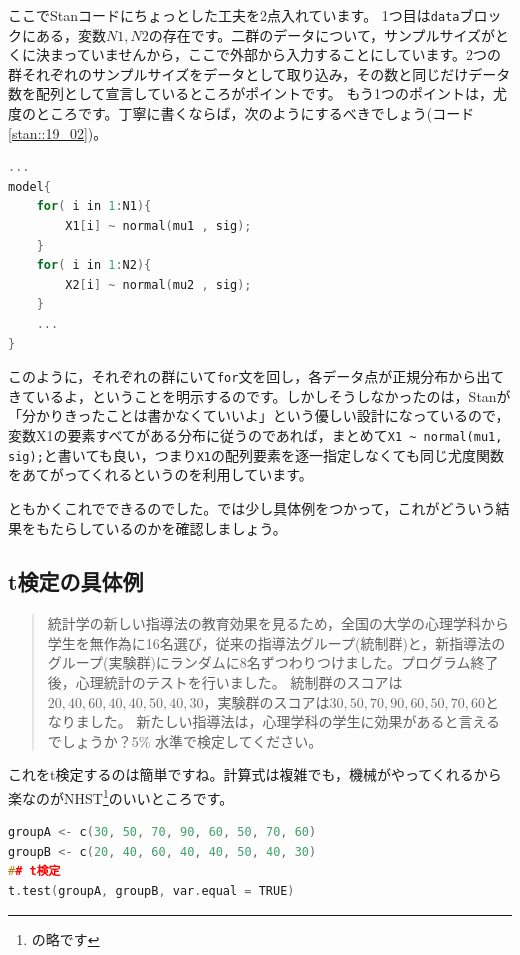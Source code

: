 \documentclass{ltjsbook}
\begin{document}
ここでStanコードにちょっとした工夫を2点入れています。
1つ目は\texttt{data}ブロックにある，変数$N1,N2$の存在です。二群のデータについて，サンプルサイズがとくに決まっていませんから，ここで外部から入力することにしています。2つの群それぞれのサンプルサイズをデータとして取り込み，その数と同じだけデータ数を配列として宣言しているところがポイントです。
もう1つのポイントは，尤度のところです。丁寧に書くならば，次のようにするべきでしょう(コード\ref{stan::19_02})。
\begin{lstlisting}[language=C++,label={stan::19_02},caption={丁寧な尤度の記載}]
    ...
model{
    for( i in 1:N1){
        X1[i] ~ normal(mu1 , sig);
    }
    for( i in 1:N2){
        X2[i] ~ normal(mu2 , sig);
    }
    ...
}

\end{lstlisting}

このように，それぞれの群にいて\texttt{for}文を回し，各データ点が正規分布から出てきているよ，ということを明示するのです。しかしそうしなかったのは，Stanが「分かりきったことは書かなくていいよ」という優しい設計になっているので，変数X1の要素すべてがある分布に従うのであれば，まとめて\verb|X1 ~ normal(mu1, sig);|と書いても良い，つまり\verb|X1|の配列要素を逐一指定しなくても同じ尤度関数をあてがってくれるというのを利用しています。

ともかくこれでできるのでした。では少し具体例をつかって，これがどういう結果をもたらしているのかを確認しましょう。
\subsection{t検定の具体例}
\begin{quote}
	統計学の新しい指導法の教育効果を見るため，全国の大学の心理学科から学生を無作為に16名選び，従来の指導法グループ(統制群)と，新指導法のグループ(実験群)にランダムに8名ずつわりつけました。プログラム終了後，心理統計のテストを行いました。
	統制群のスコアは$20, 40, 60, 40, 40, 50, 40, 30$，実験群のスコアは$30, 50, 70, 90, 60, 50, 70, 60$となりました。
	新たしい指導法は，心理学科の学生に効果があると言えるでしょうか？5\% 水準で検定してください。
\end{quote}

これをt検定するのは簡単ですね。計算式は複雑でも，機械がやってくれるから楽なのがNHST\footnote{の略です}のいいところです。
\begin{lstlisting}[language=c++,label={code:19_03},caption={帰無仮説検定のコード}]
groupA <- c(30, 50, 70, 90, 60, 50, 70, 60)
groupB <- c(20, 40, 60, 40, 40, 50, 40, 30)
## t検定
t.test(groupA, groupB, var.equal = TRUE)
\end{lstlisting}
\end{document}
